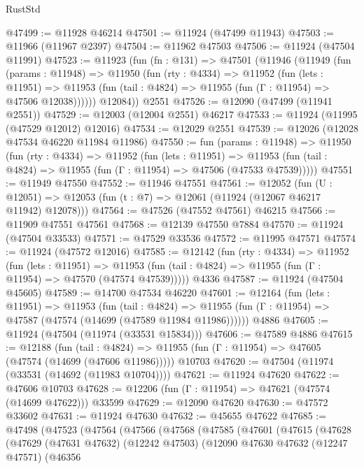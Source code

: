 \begin{lexlean}{RustStd}
\begin{coremodule}
@47499 := @11928 @46214
@47501 := @11924 (@47499 @11943)
@47503 := @11966 (@11967 @2397)
@47504 := @11962 @47503
@47506 := @11924 (@47504 @11991)
@47523 := @11923
    (fun (fn : @131) =>
    @47501
      (@11946
        (@11949
          (fun (params : @11948) =>
          @11950
            (fun (rty : @4334) =>
            @11952
              (fun (lets : @11951) =>
              @11953 (fun (tail : @4824) => @11955 (fun (Γ : @11954) => @47506 @12038))))))
        @12084))
    @2551
@47526 := @12090 (@47499 (@11941 @2551))
@47529 := @12003 (@12004 @2551) @46217
@47533 := @11924 (@11995 (@47529 @12012) @12016)
@47534 := @12029 @2551
@47539 := @12026 (@12028 @47534 @46220 @11984 @11986)
@47550 := fun (params : @11948) =>
  @11950
    (fun (rty : @4334) =>
    @11952
      (fun (lets : @11951) =>
      @11953 (fun (tail : @4824) => @11955 (fun (Γ : @11954) => @47506 (@47533 @47539)))))
@47551 := @11949 @47550
@47552 := @11946 @47551
@47561 := @12052
    (fun (U : @12051) => @12053 (fun (t : @7) => @12061 (@11924 (@12067 @46217 @11942) @12078)))
@47564 := @47526 (@47552 @47561) @46215
@47566 := @11909 @47551 @47561
@47568 := @12139 @47550 @7884
@47570 := @11924 (@47504 @33533)
@47571 := @47529 @33536
@47572 := @11995 @47571
@47574 := @11924 (@47572 @12016)
@47585 := @12142
    (fun (rty : @4334) =>
    @11952
      (fun (lets : @11951) =>
      @11953 (fun (tail : @4824) => @11955 (fun (Γ : @11954) => @47570 (@47574 @47539)))))
    @4336
@47587 := @11924 (@47504 @45605)
@47589 := @14700 @47534 @46220
@47601 := @12164
    (fun (lets : @11951) =>
    @11953
      (fun (tail : @4824) =>
      @11955 (fun (Γ : @11954) => @47587 (@47574 (@14699 (@47589 @11984 @11986))))))
    @4886
@47605 := @11924 (@47504 (@11974 (@33531 @15834)))
@47606 := @47589 @4886
@47615 := @12188
    (fun (tail : @4824) => @11955 (fun (Γ : @11954) => @47605 (@47574 (@14699 (@47606 @11986)))))
    @10703
@47620 := @47504 (@11974 (@33531 (@14692 (@11983 @10704))))
@47621 := @11924 @47620
@47622 := @47606 @10703
@47628 := @12206 (fun (Γ : @11954) => @47621 (@47574 (@14699 @47622))) @33599
@47629 := @12090 @47620
@47630 := @47572 @33602
@47631 := @11924 @47630
@47632 := @45655 @47622
@47685 := @47498
    (@47523
      (@47564
        (@47566
          (@47568
            (@47585
              (@47601
                (@47615
                  (@47628
                    (@47629
                      (@47631 @47632)
                      (@12242 @47503)
                      (@12090
                        @47630
                        @47632
                        (@12247 @47571)
                        (@46356

\end{coremodule}
\end{lexlean}
